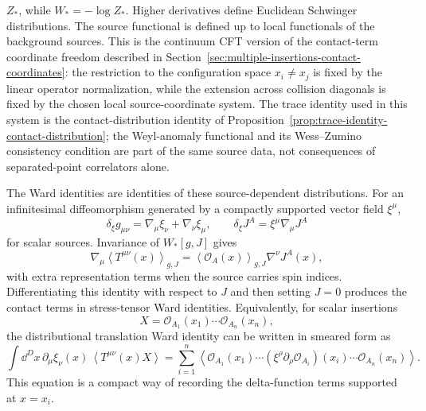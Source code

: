 \(Z_\ast\), while \(W_\ast=-\log Z_\ast\).
Higher derivatives define Euclidean Schwinger distributions.  The source
functional is defined up to local functionals of the background sources.  This
is the continuum CFT version of the contact-term coordinate freedom described in
Section~\ref{sec:multiple-insertions-contact-coordinates}: the restriction to
the configuration space \(x_i\ne x_j\) is fixed by the linear operator
normalization, while the extension across collision diagonals is fixed by the
chosen local source-coordinate system.  The trace identity used in this system is the
contact-distribution identity of
Proposition~\ref{prop:trace-identity-contact-distribution}; the Weyl-anomaly
functional and its Wess--Zumino consistency condition are part of the same
source data, not consequences of separated-point correlators alone.

The Ward identities are identities of these source-dependent distributions.
For an infinitesimal diffeomorphism generated by a compactly supported vector
field \(\xi^\mu\),
\[
  \delta_\xi g_{\mu\nu}
  =
  \nabla_\mu\xi_\nu+\nabla_\nu\xi_\mu,
  \qquad
  \delta_\xi J^A
  =
  \xi^\mu\nabla_\mu J^A
\]
for scalar sources.  Invariance of \(W_\ast[g,J]\) gives
\begin{equation}
  \nabla_\mu
  \left\langle T^{\mu\nu}(x)\right\rangle_{g,J}
  =
  \left\langle \mathcal O_A(x)\right\rangle_{g,J}
  \nabla^\nu J^A(x),
  \label{eq:cft-source-diffeomorphism-ward}
\end{equation}
with extra representation terms when the source carries spin indices.
Differentiating this identity with respect to \(J\) and then setting
\(J=0\) produces the contact terms in stress-tensor Ward identities.
Equivalently, for scalar insertions
\[
  X=\mathcal O_{A_1}(x_1)\cdots\mathcal O_{A_n}(x_n),
\]
the distributional translation Ward identity can be written in smeared form as
\begin{equation}
  \int\dd^D x\,
  \partial_\mu\xi_\nu(x)\,
  \left\langle T^{\mu\nu}(x)X\right\rangle
  =
  \sum_{i=1}^n
  \left\langle
    \mathcal O_{A_1}(x_1)\cdots
    (\xi^\rho\partial_\rho\mathcal O_{A_i})(x_i)\cdots
    \mathcal O_{A_n}(x_n)
  \right\rangle .
  \label{eq:cft-smeared-translation-ward}
\end{equation}
This equation is a compact way of recording the delta-function terms
supported at \(x=x_i\).

